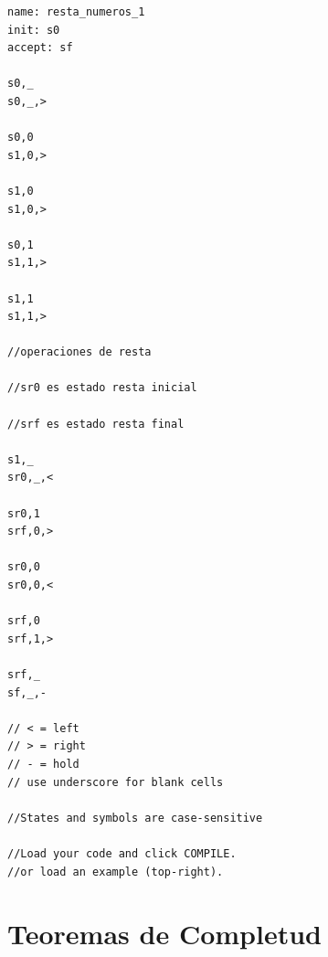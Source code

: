 \documentclass[12pt]{report}
\newcounter{it}
\theoremstyle{largebreak}
\begin{document}
\begin{lstlisting}
name: resta_numeros_1
init: s0
accept: sf

s0,_
s0,_,>

s0,0
s1,0,>

s1,0
s1,0,>

s0,1
s1,1,>

s1,1
s1,1,>

//operaciones de resta

//sr0 es estado resta inicial

//srf es estado resta final

s1,_
sr0,_,<

sr0,1
srf,0,>

sr0,0
sr0,0,<

srf,0
srf,1,>

srf,_
sf,_,-

// < = left
// > = right
// - = hold
// use underscore for blank cells

//States and symbols are case-sensitive

//Load your code and click COMPILE.
//or load an example (top-right).
\end{lstlisting}
    

    \chapter{Teoremas de Completud}
\end{document}
